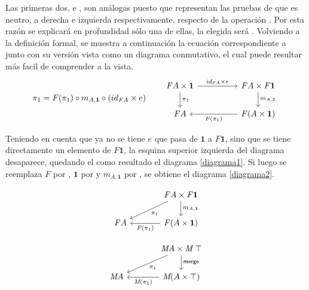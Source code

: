 Las primeras dos,  e , son análogas puesto que representan las pruebas de que  es neutro, a derecha e izquierda respectivamente, respecto de la operación . Por esta razón se explicará en profundidad sólo una de ellas, la elegida será . Volviendo a la definición formal, se muestra a continuación la ecuación correspondiente a  junto con su versión vista como un diagrama conmutativo, el cual puede resultar más facil de comprender a la vista.
\begin{equation*}
\pi_1 = \mathit{F}(\pi_1) \circ m_{A,\mathbf{1}} \circ (id_{\mathit{F}A} \times e) 
\qquad 
\begin{tikzcd}[column sep = huge]
\mathit{F} A \times \mathbf{1} \arrow[d, "\pi_1"] \arrow[r, "id_{\mathit{F} A} \times e"] & \mathit{F} A \times \mathit{F} \mathbf{1} \arrow[d, "m_{A,\mathbf{1}}"]  \\
\mathit{F} A & \mathit{F} (A \times \mathbf{1}) \arrow[l, "\mathit{F}(\pi_1)"]
\end{tikzcd}
\end{equation*}

Teniendo en cuenta que ya no se tiene $e$ que pasa de $\mathbf{1}$ a $\mathit{F} \mathbf{1}$, sino que se tiene directamente un elemento de $\mathit{F} \mathbf{1}$, la esquina superior izquierda del diagrama desaparece, quedando el como resultado el diagrama \ref{diagrama1}. Si luego se reemplaza $\mathit{F}$ por , $\mathbf{1}$ por \AgdaDatatype{$\top$} y $m_{A,\mathbf{1}}$ por , se obtiene el diagrama \ref{diagrama2}. 
\vspace{-1.25\baselineskip}

\begin{multicols}{2}
\begin{equation}\label{diagrama1}
\begin{tikzcd}[column sep = large]
& \mathit{F} A \times \mathit{F} \mathbf{1} \arrow[d, "m_{A,\mathbf{1}}"] \arrow[dl, "\pi_1"]  \\
\mathit{F} A & \mathit{F} (A \times \mathbf{1}) \arrow[l, "\mathit{F}(\pi_1)"]
\end{tikzcd}
\end{equation}

\begin{equation}\label{diagrama2}
\begin{tikzcd}[column sep = large]
& \AgdaBound{M} A \times \AgdaBound{M} \ \AgdaDatatype{$\top$} \arrow[d, "\AgdaField{merge}"] \arrow[dl, "\pi_1"]  \\
\AgdaBound{M} A & \AgdaBound{M} (A \times \AgdaDatatype{$\top$}) \arrow[l, "\AgdaBound{M}(\pi_1)"]
\end{tikzcd}
\end{equation}
\end{multicols}

